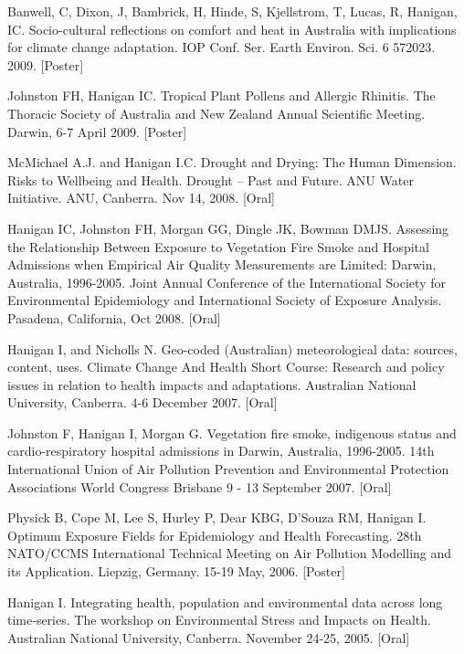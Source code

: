 \documentclass[a4paper,11pt]{article}
\begin{document}
\ind Banwell, C, Dixon, J, Bambrick, H, Hinde, S, Kjellstrom, T, Lucas, R, Hanigan, IC. Socio-cultural reflections on comfort and heat in Australia with implications for climate change adaptation. IOP Conf. Ser. Earth Environ. Sci. 6 572023. 2009. [Poster]

\ind Johnston FH, Hanigan IC.  Tropical Plant Pollens and Allergic Rhinitis.  The Thoracic Society of Australia and New Zealand Annual Scientific Meeting.  Darwin, 6-7 April 2009. [Poster]

\ind McMichael A.J. and Hanigan I.C. Drought and Drying: The Human Dimension. Risks to Wellbeing and Health. Drought – Past and Future. ANU Water Initiative. ANU, Canberra. Nov 14, 2008. [Oral]

\ind Hanigan IC, Johnston FH, Morgan GG, Dingle JK, Bowman DMJS. Assessing the Relationship Between Exposure to Vegetation Fire Smoke and Hospital Admissions when Empirical Air Quality Measurements are Limited: Darwin, Australia, 1996-2005. Joint Annual Conference of the International Society for Environmental Epidemiology and International Society of Exposure Analysis. Pasadena, California, Oct 2008. [Oral]

\ind Hanigan I, and Nicholls N. Geo-coded (Australian) meteorological data: sources, content, uses. Climate Change And Health Short Course: Research and policy issues in relation to health impacts and adaptations.  Australian National University, Canberra. 4-6 December 2007. [Oral]

\ind Johnston F, Hanigan I, Morgan G. Vegetation fire smoke, indigenous status and cardio-respiratory hospital admissions in Darwin, Australia, 1996-2005. 14th International Union of Air Pollution Prevention and Environmental Protection Associations World Congress Brisbane 9 - 13 September 2007. [Oral]

\ind Physick B, Cope M, Lee S, Hurley P, Dear KBG, D’Souza RM, Hanigan I. Optimum Exposure Fields for Epidemiology and Health Forecasting. 28th NATO/CCMS International Technical Meeting on Air Pollution Modelling and its Application. Liepzig, Germany. 15-19 May, 2006. [Poster]

\ind Hanigan I. Integrating health, population and environmental data across long time‑series. The workshop on Environmental Stress and Impacts on Health. Australian National University, Canberra. November 24-25, 2005. [Oral]
\end{document}
